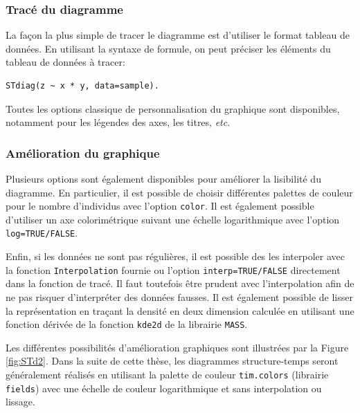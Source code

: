 \subsubsection{Tracé du diagramme}

La façon la plus simple de tracer le diagramme est d'utiliser le format tableau
de données. En utilisant la syntaxe de formule, on peut préciser les éléments du
tableau de données à tracer:
\begin{verbatim}
STdiag(z ~ x * y, data=sample).
\end{verbatim}
Toutes les options classique de personnalisation du graphique sont disponibles,
notamment pour les légendes des axes, les titres, \textit{etc}.

\subsubsection{Amélioration du graphique}

Plusieurs options sont également disponibles pour améliorer la lisibilité du
diagramme. En particulier, il est possible de choisir différentes palettes de
couleur pour le nombre d'individus avec l'option \texttt{color}. Il est
également possible d'utiliser un axe colorimétrique suivant une échelle
logarithmique avec l'option \texttt{log=TRUE/FALSE}. 

Enfin, si les données ne sont pas régulières, il est possible des les interpoler
avec la fonction \texttt{Interpolation} fournie ou l'option
\texttt{interp=TRUE/FALSE} directement dans la fonction de tracé. Il faut
toutefois être prudent avec l'interpolation afin de ne pas risquer d'interpréter
des données fausses. Il est également possible de lisser la représentation en
traçant la densité en deux dimension calculée en utilisant une fonction dérivée
de la fonction \texttt{kde2d} de la librairie \texttt{MASS}. 

Les différentes possibilités d'amélioration graphiques sont illustrées par la
Figure \ref{fig:STd2}. Dans la suite de cette thèse, les diagrammes
structure-temps seront généralement réalisés en utilisant la palette de couleur
\texttt{tim.colors} (librairie \texttt{fields}) avec une échelle de couleur
logarithmique et sans interpolation ou lissage. 

